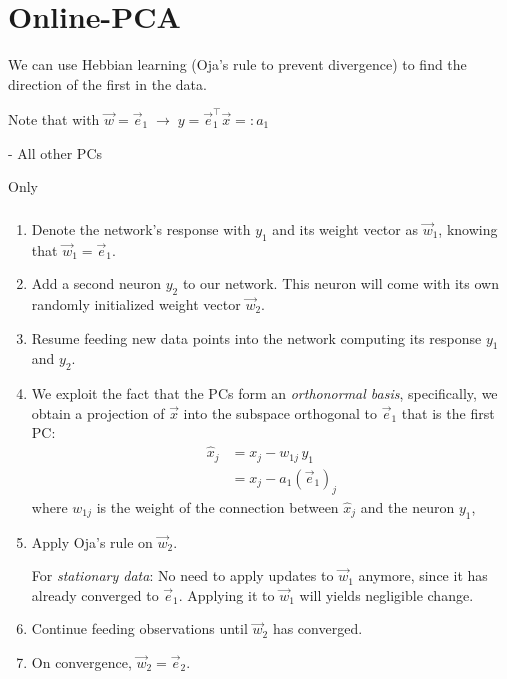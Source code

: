 
\section{Online-PCA}


\begin{frame}
We can use Hebbian learning (Oja's rule to prevent divergence) 
to find the direction of the first  in the data. \\

\pause

Note that with $\vec w = \vec e_1 \; \rightarrow \; y = \vec e_1^\top \vec x =: a_1$\\


\pause

- All other PCs

\end{frame}

\begin{frame}{Only}\frametitle{\secname}
\begin{enumerate}
\item<only@1-3> Denote the network's response with $y_1$ and its weight vector as $\vec w_1$, knowing that $\vec w_1 = \vec e_1$.
\item<only@1-3> Add a second neuron $y_2$ to our network. This neuron will come with its own randomly initialized weight vector $\vec w_2$.
\item<only@1-3,4> Resume feeding new data points into the network computing its response $y_1$ and $y_2$.
\item<only@4,5> We exploit the fact that the PCs form an \emph{orthonormal basis}, specifically, we obtain a projection of $\vec x$ 
into the subspace orthogonal to $\vec e_1$ that is the first PC:
\begin{align}
\hat x_j &= x_j - w_{1j} \, y_1 \\
         &= x_j - a_1 (\vec e_1)_j
\end{align}
where $w_{1j}$ is the weight of the connection between $\hat x_j$ and the neuron $y_1$,
\item<only@4-> Apply Oja's rule on $\vec w_2$.

For \emph{stationary data}: No need to apply updates to $\vec w_1$ anymore, since it has already converged to $\vec e_1$. Applying it to $\vec w_1$ will yields negligible change.
 
\item<only@4-> Continue feeding observations until $\vec w_2$ has converged.
\item<only@4-> On convergence, $\vec w_2 = \vec e_2$.
\end{enumerate}

\end{frame}

